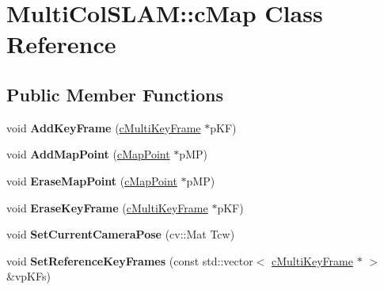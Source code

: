 \hypertarget{classMultiColSLAM_1_1cMap}{}\section{Multi\+Col\+S\+L\+AM\+:\+:c\+Map Class Reference}
\label{classMultiColSLAM_1_1cMap}
\subsection*{Public Member Functions}
\begin{DoxyCompactItemize}
\item 
void {\bfseries Add\+Key\+Frame} (\hyperlink{classMultiColSLAM_1_1cMultiKeyFrame}{c\+Multi\+Key\+Frame} $\ast$p\+KF)\hypertarget{classMultiColSLAM_1_1cMap_a2b6fb1278b0cd9ebfee9153851643751}{}\label{classMultiColSLAM_1_1cMap_a2b6fb1278b0cd9ebfee9153851643751}

\item 
void {\bfseries Add\+Map\+Point} (\hyperlink{classMultiColSLAM_1_1cMapPoint}{c\+Map\+Point} $\ast$p\+MP)\hypertarget{classMultiColSLAM_1_1cMap_a00d43618bbccb50f69b961c4bc5b677c}{}\label{classMultiColSLAM_1_1cMap_a00d43618bbccb50f69b961c4bc5b677c}

\item 
void {\bfseries Erase\+Map\+Point} (\hyperlink{classMultiColSLAM_1_1cMapPoint}{c\+Map\+Point} $\ast$p\+MP)\hypertarget{classMultiColSLAM_1_1cMap_a50e2d7d2ecf86a86691dfa30784d21f9}{}\label{classMultiColSLAM_1_1cMap_a50e2d7d2ecf86a86691dfa30784d21f9}

\item 
void {\bfseries Erase\+Key\+Frame} (\hyperlink{classMultiColSLAM_1_1cMultiKeyFrame}{c\+Multi\+Key\+Frame} $\ast$p\+KF)\hypertarget{classMultiColSLAM_1_1cMap_ad2de0ad3e6be303599f42433446bee2a}{}\label{classMultiColSLAM_1_1cMap_ad2de0ad3e6be303599f42433446bee2a}

\item 
void {\bfseries Set\+Current\+Camera\+Pose} (cv\+::\+Mat Tcw)\hypertarget{classMultiColSLAM_1_1cMap_aa61504cc2f31ba945d37b2fe57f99d00}{}\label{classMultiColSLAM_1_1cMap_aa61504cc2f31ba945d37b2fe57f99d00}

\item 
void {\bfseries Set\+Reference\+Key\+Frames} (const std\+::vector$<$ \hyperlink{classMultiColSLAM_1_1cMultiKeyFrame}{c\+Multi\+Key\+Frame} $\ast$ $>$ \&vp\+K\+Fs)\hypertarget{classMultiColSLAM_1_1cMap_a8cd75c02932276c55e7193b073ea6bb9}{}\label{classMultiColSLAM_1_1cMap_a8cd75c02932276c55e7193b073ea6bb9}


\end{DoxyCompactItemize}

